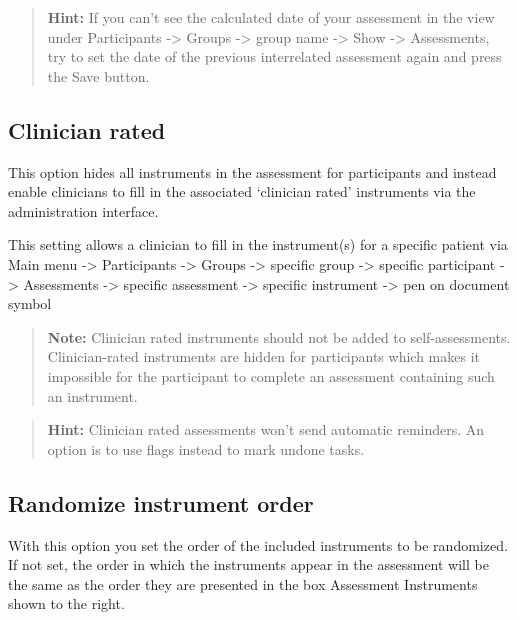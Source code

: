 \documentclass[]{book}
\begin{document}
\begin{quote}
\textbf{Hint:} If you can't see the calculated date of your assessment in the view under Participants -\textgreater{} Groups -\textgreater{} group name -\textgreater{} Show -\textgreater{} Assessments, try to set the date of the previous interrelated assessment again and press the Save button.
\end{quote}

\hypertarget{clinician-rated}{%
\subsection{Clinician rated}\label{clinician-rated}}

This option hides all instruments in the assessment for participants and instead enable clinicians to fill in the associated `clinician rated' instruments via the administration interface.

This setting allows a clinician to fill in the instrument(s) for a specific patient via Main menu -\textgreater{} Participants -\textgreater{} Groups -\textgreater{} specific group -\textgreater{} specific participant -\textgreater{} Assessments -\textgreater{} specific assessment -\textgreater{} specific instrument -\textgreater{} pen on document symbol

\begin{quote}
\textbf{Note:} Clinician rated instruments should not be added to self-assessments. Clinician-rated instruments are hidden for participants which makes it impossible for the participant to complete an assessment containing such an instrument.
\end{quote}

\begin{quote}
\textbf{Hint:} Clinician rated assessments won't send automatic reminders. An option is to use flags instead to mark undone tasks.
\end{quote}

\hypertarget{randomize-instrument-order}{%
\subsection{Randomize instrument order}\label{randomize-instrument-order}}

With this option you set the order of the included instruments to be randomized. If not set, the order in which the instruments appear in the assessment will be the same as the order they are presented in the box Assessment Instruments shown to the right.
\end{document}
